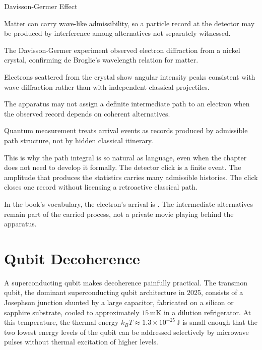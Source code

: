\begin{phenom}{Davisson-Germer Effect}
\label{ph:davisson-germer-effect}

\PhStatement Matter can carry wave-like admissibility, so a particle record at
the detector may be produced by interference among alternatives not separately
witnessed.

\PhOrigin The Davisson-Germer experiment observed electron diffraction from a
nickel crystal, confirming de Broglie's wavelength relation for matter.

\PhObservation Electrons scattered from the crystal show angular intensity
peaks consistent with wave diffraction rather than with independent classical
projectiles.

\PhConstraint The apparatus may not assign a definite intermediate path to an
electron when the observed record depends on coherent alternatives.

\PhConsequence Quantum measurement treats arrival events as records produced by
admissible path structure, not by hidden classical itinerary.

\end{phenom}

This is why the path integral is so natural as language, even when the chapter
does not need to develop it formally. The detector click is a finite event.
The amplitude that produces the statistics carries many admissible histories.
The click closes one record without licensing a retroactive classical path.

In the book's vocabulary, the electron's arrival is . The
intermediate alternatives remain part of the carried process, not a private
movie playing behind the apparatus.

\section{Qubit Decoherence}
\label{se:qubit-decoherence}

A superconducting qubit makes decoherence painfully practical. The transmon
qubit, the dominant superconducting qubit architecture in 2025, consists of
a Josephson junction shunted by a large capacitor, fabricated on a silicon
or sapphire substrate, cooled to approximately $15\,\mathrm{mK}$ in a
dilution refrigerator. At this temperature, the thermal energy
$k_B T \approx 1{.}3 \times 10^{-25}\,\mathrm{J}$ is small enough that the
two lowest energy levels of the qubit can be addressed selectively by
microwave pulses without thermal excitation of higher levels.

